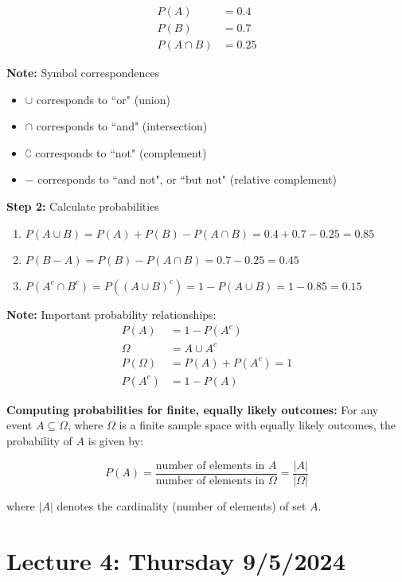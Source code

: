 \documentclass{article}
\begin{document}
\begin{align*}
    P(A) &= 0.4 \\
    P(B) &= 0.7 \\
    P(A \cap B) &= 0.25
\end{align*}

\textbf{Note:} Symbol correspondences
\begin{itemize}
    \item $\cup$ corresponds to ``or" (union)
    \item $\cap$ corresponds to ``and" (intersection)
    \item $\complement$ corresponds to ``not" (complement)
    \item $-$ corresponds to ``and not", or ``but not" (relative complement)
\end{itemize}

\textbf{Step 2:} Calculate probabilities
\begin{enumerate}
    \item $P(A \cup B) = P(A) + P(B) - P(A \cap B) = 0.4 + 0.7 - 0.25 = 0.85$
    \item $P(B - A) = P(B) - P(A \cap B) = 0.7 - 0.25 = 0.45$
    \item $P(A^c \cap B^c) = P((A \cup B)^c) = 1 - P(A \cup B) = 1 - 0.85 = 0.15$
    
\end{enumerate}

\textbf{Note:} Important probability relationships:
\begin{align*}
    P(A) &= 1 - P(A^c) \\
    \Omega &= A \cup A^c \\
    P(\Omega) &= P(A) + P(A^c) = 1 \\
    P(A^c) &= 1 - P(A)
\end{align*}

\textbf{Computing probabilities for finite, equally likely outcomes:}
For any event $A \subseteq \Omega$, where $\Omega$ is a finite sample space with equally likely outcomes, the probability of $A$ is given by:

\[
P(A) = \frac{\text{number of elements in } A}{\text{number of elements in } \Omega} = \frac{|A|}{|\Omega|}
\]

where $|A|$ denotes the cardinality (number of elements) of set $A$.

\pagebreak

\section*{Lecture 4: Thursday 9/5/2024}
\end{document}
